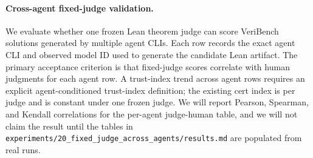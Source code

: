 
\paragraph{Cross-agent fixed-judge validation.}
We evaluate whether one frozen Lean theorem judge can score VeriBench solutions generated by multiple agent CLIs.
Each row records the exact agent CLI and observed model ID used to generate the candidate Lean artifact.
The primary acceptance criterion is that fixed-judge scores correlate with human judgments for each agent row.
A trust-index trend across agent rows requires an explicit agent-conditioned trust-index definition; the existing cert index is per judge and is constant under one frozen judge.
We will report Pearson, Spearman, and Kendall correlations for the per-agent judge-human table, and we will not claim the result until the tables in \texttt{experiments/20\_fixed\_judge\_across\_agents/results.md} are populated from real runs.
